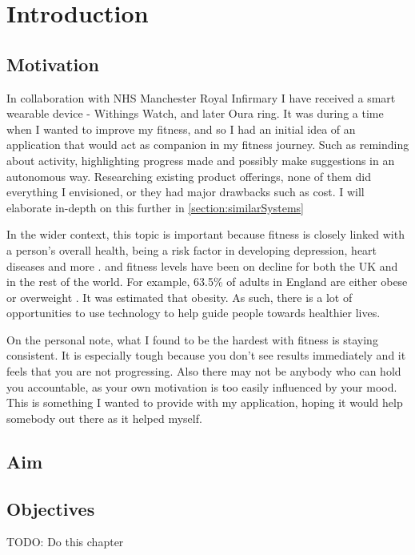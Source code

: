 \chapter{Introduction}
\label{cha:intro}

\section{Motivation}
\par
In collaboration with NHS Manchester Royal Infirmary I have received a smart wearable device - Withings Watch,
and later Oura ring. It was during a time when I wanted to improve my fitness, and so I had an initial idea of an
application that would act as companion in my fitness journey. Such as reminding about activity, highlighting progress made and
possibly make suggestions in an autonomous way. Researching existing product offerings, none of them 
did everything I envisioned, or they had major drawbacks such as cost. I will elaborate in-depth on this further in \ref{section:similarSystems}
\par
In the wider context, this topic is important because fitness is closely linked with a person's overall health, being a risk factor in developing depression, heart diseases and more \cite{nhsObesity}. and fitness levels have been on decline for both the UK and in the rest of the world.
For example, 63.5\% of adults in England are either obese or overweight \cite{ukObesity2023Survey}. It was estimated that obesity. As such, there is a lot of opportunities 
to use technology to help guide people towards healthier lives.
\par
On the personal note, what I found to be the hardest with fitness is staying consistent. It is especially tough because you don't 
see results immediately and it feels that you are not progressing. Also there may not be anybody who can hold you accountable, as your own motivation
is too easily influenced by your mood. This is something I wanted to provide with my application, hoping it would help somebody out there as it helped myself.
\section{Aim}
\section{Objectives}


TODO: Do this chapter
